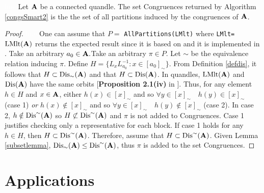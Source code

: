 \documentclass{mcom-l}
\begin{document}
\begin{theorem}\textcolor{white}{line}\newline
Let $\mathbf{A}$ be a connected quandle. The set \textsf{Congruences} returned by Algorithm \ref{congsSmart2} is the the set of all partitions induced by the congruences of $\mathbf{A}$.
\begin{proof}\textcolor{white}{line}\newline
One can assume that $P=$ \texttt{AllPartitions(LMlt)} where \texttt{LMlt=}$\operatorname{LMlt}(\mathbf{A})$ returns the expected result since it is based on \cite{schonert1994finding,seress_2003} and it is implemented in \magma. Take an arbitrary $a_0 \in \mathbf{A}. $\newline Take an arbitrary $\pi \in P$. Let $\sim$ be the equivalence relation inducing $\pi$.  Define $H = \{L_xL_{a_0}^{-1} : x \in [a_0]_\sim\}$. From Definition \ref{defdis}, it follows that $H\subset \operatorname{Dis}_\sim(\mathbf{A})$ and that $H\subset \operatorname{Dis}(\mathbf{A})$.
In quandles, $\operatorname{LMlt}(\mathbf{A})$ and $\operatorname{Dis}(\mathbf{A})$ have the same orbits [\textbf{Proposition 2.1(iv)} in \cite{hulpke2016connected}]. Thus, for any element $h\in H$ and $x\in \mathbf{A}$, either $h(x)\in [x]_\sim$ and so $\forall y \in [x]_\sim\quad h(y)\in[x]_\sim$ (case 1) \emph{or} $h(x)\notin [x]_\sim$ and so $\forall y \in [x]_\sim \quad h(y)\notin [x]_\sim$ (case 2). In case 2, $h \notin \operatorname{Dis}^\sim(\mathbf{A})$ so $H \not\subset \operatorname{Dis}^\sim(\mathbf{A})$ and $\pi$ is not added to \textsf{Congruences}. Case 1 justifies checking only a representative for each block. If case 1 holds for any $h \in H$, then $H \subset \operatorname{Dis}^\sim(\mathbf{A})$.\newline
Therefore, assume that $H \subset \operatorname{Dis}^\sim(\mathbf{A})$.\newline
Given Lemma \ref{subsetlemma}, $\operatorname{Dis}_{\sim}(\mathbf{A})\leq \operatorname{Dis}^{\sim}(\mathbf{A})$, thus $\pi$ is added to the set \textsf{Congruences}.

\end{proof}
\end{theorem}





\section{Applications}\label{AppSection}
\end{document}

